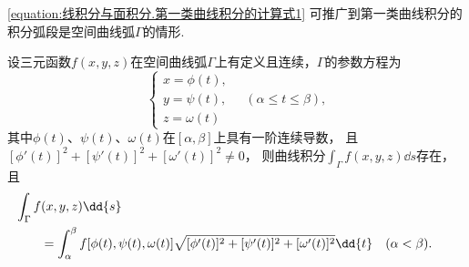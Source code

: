 \cref{equation:线积分与面积分.第一类曲线积分的计算式1} 可推广到第一类曲线积分的积分弧段是空间曲线弧\(\Gamma\)的情形.
\begin{theorem}
设三元函数\(f(x,y,z)\)在空间曲线弧\(\Gamma\)上有定义且连续，\(\Gamma\)的参数方程为\begin{equation*}
	\left\{ \begin{array}{l}
		x = \phi(t), \\
		y = \psi(t), \\
		z = \omega(t)
	\end{array} \right.
	\quad(\alpha \leq t \leq \beta),
\end{equation*}其中\(\phi(t)\)、\(\psi(t)\)、\(\omega(t)\)在\([\alpha,\beta]\)上具有一阶连续导数，
且\([\phi'(t)]^2+[\psi'(t)]^2+[\omega'(t)]^2 \neq 0\)，
则曲线积分\(\int_\Gamma f(x,y,z) \dd{s}\)存在，
且\begin{equation}\label{equation:线积分与面积分.第一类曲线积分的计算式2}
	\begin{aligned}
		&\hspace{-20pt}
		\int_\Gamma f(x,y,z) \dd{s} \\
		&= \int_\alpha^\beta f[\phi(t),\psi(t),\omega(t)] \sqrt{[\phi'(t)]^2+[\psi'(t)]^2+[\omega'(t)]^2} \dd{t}
		\quad(\alpha<\beta).
	\end{aligned}
\end{equation}
\end{theorem}

